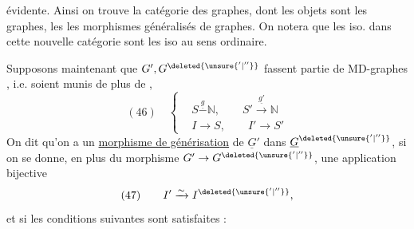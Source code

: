 évidente. Ainsi on trouve la catégorie  des graphes, dont les objets sont les graphes, les  les morphismes généralisés de graphes. On notera que les iso. dans cette nouvelle catégorie sont les iso au sens ordinaire.

Supposons maintenant que $G',G^{\deleted{\unsure{'|''}}}$ fassent partie de MD-graphes , i.e. soient munis de plus de ,
\[
(46)\quad\left\{\begin{aligned}
&S\overset{\underline g}{-}\mathbb N,\qquad S'\xrightarrow{\underline{g'}}\mathbb N\\
&I\longrightarrow S,\qquad I'\longrightarrow S'
\end{aligned}\right.
\]
On dit qu'on a un \uline{morphisme de générisation} de $\underline G'$ dans $\underline G^{\deleted{\unsure{'|''}}}$, si on se donne, en plus du morphisme  $G'\to G^{\deleted{\unsure{'|''}}}$, une application bijective
\[
(47)\qquad I'\xrightarrow{\sim}I^{\deleted{\unsure{'|''}}},
\]
 et si les conditions suivantes sont satisfaites :
